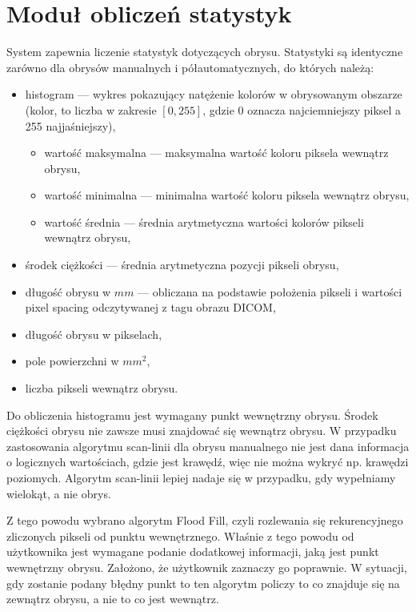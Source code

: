 \documentclass[a4paper,11pt,twoside,openright]{report}
\theoremstyle{definition}
\begin{document}
\section {Moduł obliczeń statystyk}

System zapewnia liczenie statystyk dotyczących obrysu. Statystyki są identyczne zarówno dla obrysów manualnych i półautomatycznych, do których należą:

\begin{itemize}[noitemsep]
\item histogram --- wykres pokazujący natężenie kolorów w obrysowanym obszarze (kolor, to liczba w zakresie $[0,255]$, gdzie 0 oznacza najciemniejszy piksel a 255 najjaśniejszy),
\begin{itemize}[noitemsep]
\item wartość maksymalna --- maksymalna wartość koloru piksela wewnątrz obrysu,
\item wartość minimalna --- minimalna wartość koloru piksela wewnątrz obrysu,
\item wartość średnia --- średnia arytmetyczna wartości kolorów pikseli wewnątrz obrysu,
\end{itemize}
\item środek ciężkości --- średnia arytmetyczna pozycji pikseli obrysu,
\item długość obrysu w $mm$ --- obliczana na podstawie położenia pikseli i wartości pixel spacing odczytywanej z tagu obrazu DICOM,
\item długość obrysu w pikselach,
\item pole powierzchni w $mm^2$,
\item liczba pikseli wewnątrz obrysu.
\end{itemize}

Do obliczenia histogramu jest wymagany punkt wewnętrzny obrysu. Środek ciężkości obrysu nie zawsze musi znajdować się wewnątrz obrysu. W przypadku zastosowania algorytmu scan-linii dla obrysu manualnego nie jest dana informacja o logicznych wartościach, gdzie jest krawędź, więc nie można wykryć np. krawędzi poziomych. Algorytm scan-linii lepiej nadaje się w przypadku, gdy wypełniamy wielokąt, a nie obrys.

Z tego powodu wybrano algorytm Flood Fill, czyli rozlewania się rekurencyjnego zliczonych pikseli od punktu wewnętrznego. Właśnie z tego powodu od użytkownika jest wymagane podanie dodatkowej informacji, jaką jest punkt wewnętrzny obrysu. Założono, że użytkownik zaznaczy go poprawnie. W sytuacji, gdy zostanie podany błędny punkt to ten algorytm policzy to co znajduje się na zewnątrz obrysu, a nie to co jest wewnątrz.
\end{document}
